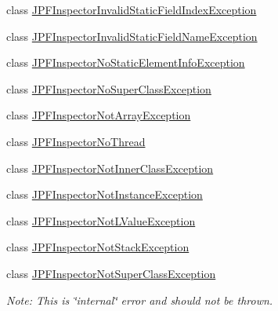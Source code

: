 \begin{DoxyCompactItemize}
\item 
class \hyperlink{classgov_1_1nasa_1_1jpf_1_1inspector_1_1exceptions_1_1_j_p_f_inspector_invalid_static_field_index_exception}{J\+P\+F\+Inspector\+Invalid\+Static\+Field\+Index\+Exception}
\item 
class \hyperlink{classgov_1_1nasa_1_1jpf_1_1inspector_1_1exceptions_1_1_j_p_f_inspector_invalid_static_field_name_exception}{J\+P\+F\+Inspector\+Invalid\+Static\+Field\+Name\+Exception}
\item 
class \hyperlink{classgov_1_1nasa_1_1jpf_1_1inspector_1_1exceptions_1_1_j_p_f_inspector_no_static_element_info_exception}{J\+P\+F\+Inspector\+No\+Static\+Element\+Info\+Exception}
\item 
class \hyperlink{classgov_1_1nasa_1_1jpf_1_1inspector_1_1exceptions_1_1_j_p_f_inspector_no_super_class_exception}{J\+P\+F\+Inspector\+No\+Super\+Class\+Exception}
\item 
class \hyperlink{classgov_1_1nasa_1_1jpf_1_1inspector_1_1exceptions_1_1_j_p_f_inspector_not_array_exception}{J\+P\+F\+Inspector\+Not\+Array\+Exception}
\item 
class \hyperlink{classgov_1_1nasa_1_1jpf_1_1inspector_1_1exceptions_1_1_j_p_f_inspector_no_thread}{J\+P\+F\+Inspector\+No\+Thread}
\item 
class \hyperlink{classgov_1_1nasa_1_1jpf_1_1inspector_1_1exceptions_1_1_j_p_f_inspector_not_inner_class_exception}{J\+P\+F\+Inspector\+Not\+Inner\+Class\+Exception}
\item 
class \hyperlink{classgov_1_1nasa_1_1jpf_1_1inspector_1_1exceptions_1_1_j_p_f_inspector_not_instance_exception}{J\+P\+F\+Inspector\+Not\+Instance\+Exception}
\item 
class \hyperlink{classgov_1_1nasa_1_1jpf_1_1inspector_1_1exceptions_1_1_j_p_f_inspector_not_l_value_exception}{J\+P\+F\+Inspector\+Not\+L\+Value\+Exception}
\item 
class \hyperlink{classgov_1_1nasa_1_1jpf_1_1inspector_1_1exceptions_1_1_j_p_f_inspector_not_stack_exception}{J\+P\+F\+Inspector\+Not\+Stack\+Exception}
\item 
class \hyperlink{classgov_1_1nasa_1_1jpf_1_1inspector_1_1exceptions_1_1_j_p_f_inspector_not_super_class_exception}{J\+P\+F\+Inspector\+Not\+Super\+Class\+Exception}
\begin{DoxyCompactList}\small\item\em Note\+: This is \char`\"{}internal\char`\"{} error and should not be thrown. \end{DoxyCompactList}\item 

\end{DoxyCompactItemize}
